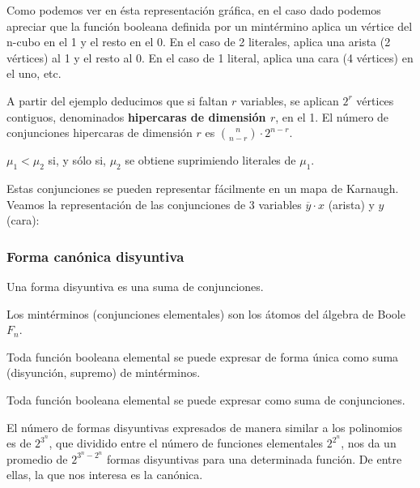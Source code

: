 \begin{ejemplo}[Visual]
    Como podemos ver en ésta representación gráfica, en el caso dado podemos apreciar que la función booleana definida por un mintérmino aplica un vértice del n-cubo en el 1 y el resto en el 0.
    En el caso de 2 literales, aplica una arista (2 vértices) al 1 y el resto al 0. En el caso de 1 literal, aplica una cara (4 vértices) en el uno, etc.
\end{ejemplo}

A partir del ejemplo deducimos que si faltan $r$ variables, se aplican $2^r$ vértices contiguos, denominados \textbf{hipercaras de dimensión $r$}, en el 1. El número de conjunciones
hipercaras de dimensión $r$ es $\binom{n}{n-r} \cdot 2^{n-r}$.
\begin{nota}
    $\mu_1 < \mu_2$ si, y sólo si, $\mu_2$ se obtiene suprimiendo literales de $\mu_1$.
\end{nota}

\begin{ejemplo}
    Estas conjunciones se pueden representar fácilmente en un mapa de Karnaugh. Veamos la representación de las conjunciones de 3 variables $\overline{y} \cdot x$ (arista) y $y$ (cara):
    \begin{center}
        \begin{Karnaugh_2x4}
        \end{Karnaugh_2x4}
    \end{center}
\end{ejemplo}

\subsubsection{Forma canónica disyuntiva}
\begin{ndef}
    Una forma disyuntiva es una suma de conjunciones.
\end{ndef}
\begin{nth}
    Los mintérminos (conjunciones elementales) son los átomos del álgebra de Boole $F_n$.
\end{nth}
\begin{nth}
    Toda función booleana elemental se puede expresar de forma única como suma (disyunción, supremo) de mintérminos.
\end{nth}
\begin{ncor}
    Toda función booleana elemental se puede expresar como suma de conjunciones.
\end{ncor}
El número de formas disyuntivas expresados de manera similar a los polinomios es de $2^{3^n}$, que dividido entre el número de funciones elementales $2^{2^n}$, nos da un promedio de $2^{3^n-2^n}$ formas disyuntivas para una determinada función.
De entre ellas, la que nos interesa es la canónica.

